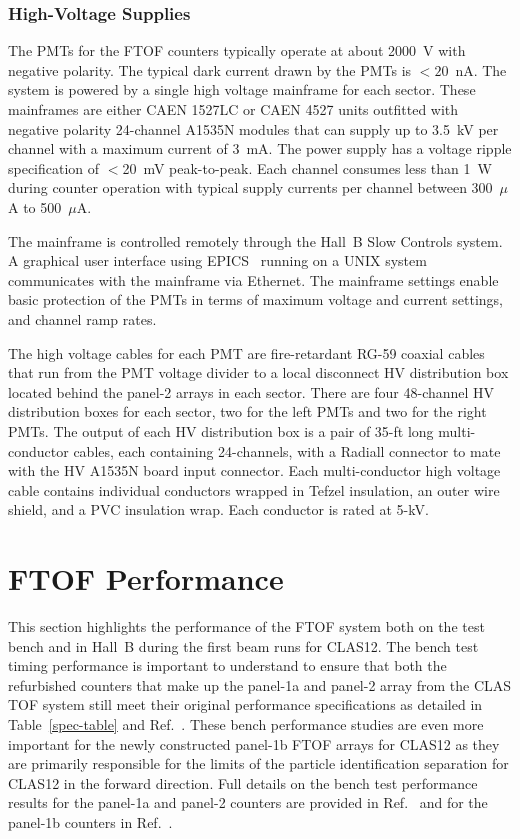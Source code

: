 \documentclass{elsart}
\begin{document}
\subsubsection{High-Voltage Supplies}

The PMTs for the FTOF counters typically operate at about 2000~V with negative polarity. The typical
dark current drawn by the PMTs is $<20$~nA. The system is powered by a single high voltage mainframe
for each sector. These mainframes are either CAEN 1527LC or CAEN 4527 units outfitted with negative
polarity 24-channel A1535N modules that can supply up to 3.5~kV per channel with a maximum current of
3~mA. The power supply has a voltage ripple specification of $<$20~mV peak-to-peak. Each channel
consumes less than 1~W during counter operation with typical supply currents per channel between
300~$\mu$A to 500~$\mu$A.

The mainframe is controlled remotely through the Hall~B Slow Controls system. A graphical user interface
using EPICS~\cite{epics} running on a UNIX system communicates with the mainframe via Ethernet. The
mainframe settings enable basic protection of the PMTs in terms of maximum voltage and current settings,
and channel ramp rates.

The high voltage cables for each PMT are fire-retardant RG-59 coaxial cables that run from the PMT
voltage divider to a local disconnect HV distribution box located behind the panel-2 arrays in each
sector. There are four 48-channel HV distribution boxes for each sector, two for the left PMTs and two
for the right PMTs. The output of each HV distribution box is a pair of 35-ft long multi-conductor cables,
each containing 24-channels, with a Radiall connector to mate with the HV A1535N board input connector.
Each multi-conductor high voltage cable contains individual conductors wrapped in Tefzel insulation, an outer
wire shield, and a PVC insulation wrap. Each conductor is rated at 5-kV.

\section{FTOF Performance}
\label{sec:performance}

This section highlights the performance of the FTOF system both on the test bench and in Hall~B
during the first beam runs for CLAS12. The bench test timing performance is important to
understand to ensure that both the refurbished counters that make up the panel-1a and panel-2
array from the CLAS TOF system still meet their original performance specifications as detailed
in Table~\ref{spec-table} and Ref.~\cite{tof-nim}. These bench performance studies are even more
important for the newly constructed panel-1b FTOF arrays for CLAS12 as they are primarily
responsible for the limits of the particle identification separation for CLAS12 in the forward direction.
Full details on the bench test performance results for the panel-1a and panel-2 counters are provided
in Ref.~\cite{dsc-cn2013-001} and for the panel-1b counters in Ref.~\cite{nim-p1b}.
\end{document}
